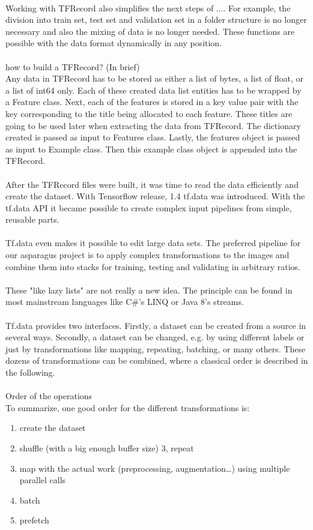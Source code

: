 {\\
Working with TFRecord also simplifies the next steps of .... For example, the division into train set, test set and validation set in a folder structure is no longer necessary and also the mixing of data is no longer needed. These functions are possible with the data format dynamically in any position.  \\
\\
how to build a TFRecord? (In brief) \\
Any data in TFRecord has to be stored as either a list of bytes, a list of float, or a list of int64 only. Each of these created data list entities has to be wrapped by a Feature class. Next, each of the features is stored in a key value pair with the key corresponding to the title being allocated to each feature. These titles are going to be used later when extracting the data from TFRecord. The dictionary created is passed as input to Features class. Lastly, the features object is passed as input to Example class. Then this example class object is appended into the TFRecord. \\
\\
After the TFRecord files were built, it was time to read the data efficiently and create the dataset. With Tensorflow release, 1.4 tf.data was introduced. With the tf.data API it became possible to create complex input pipelines from simple, reusable parts.\\
\\
Tf.data even makes it possible to edit large data sets. The preferred pipeline for our asparagus project is to apply complex transformations to the images and combine them into stacks for training, testing and validating in arbitrary ratios. \\
\\
These "like lazy lists" are not really a new idea. The principle can be found in most mainstream languages like C#'s LINQ or Java 8's streams.  \\
\\
Tf.data provides two interfaces. Firstly, a dataset can be created from a source in several ways. Secondly, a dataset can be changed, e.g. by using different labels or just by transformations like mapping, repeating, batching, or many others. These dozens of transformations can be combined, where a classical order is described in the following. \\
\\
Order of the operations \\
To summarize, one good order for the different transformations is:
\begin{enumerate}
\item create the dataset
\item shuffle (with a big enough buffer size) 3, repeat
\item map with the actual work (preprocessing, augmentation…) using multiple parallel calls
\item batch
\item prefetch
\end{enumerate}
\\

}
